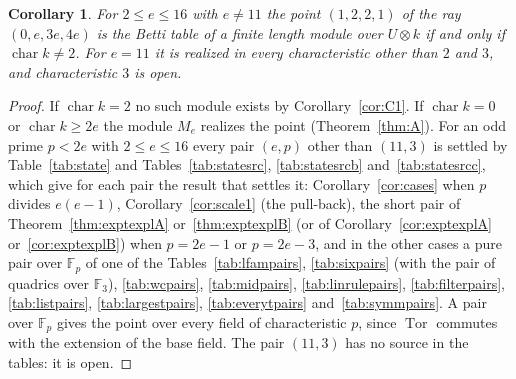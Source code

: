 \documentclass[11pt]{article}
\newtheorem{corollary}{Corollary}
\theoremstyle{definition}
\theoremstyle{remark}
\newcommand{\F}{\mathbb{F}}
\newcommand{\Tor}{\operatorname{Tor}}
\newcommand{\ch}{\operatorname{char}}
\begin{document}
\begin{table}[htbp]
\centering\scriptsize

\caption{Table~\ref{tab:statesrc} continued: the pairs $(e,p)$ with $11\le e\le14$ and $p$ odd below $2e$ and the result that settles each; the pairs marked open are those with no pure pair known. The table continues in Table~\ref{tab:statesrcc}.}
\label{tab:statesrcb}
\end{table}

\begin{table}[htbp]
\centering\scriptsize

\caption{Tables~\ref{tab:statesrc} and~\ref{tab:statesrcb} continued: the pairs $(e,p)$ with $e=15$ and $e=16$ and $p$ odd below $2e$ and the result that settles each.}
\label{tab:statesrcc}
\end{table}

\begin{corollary}\label{cor:eight}
For $2\le e\le16$ with $e\ne11$ the point $(1,2,2,1)$ of the ray $(0,e,3e,4e)$ is the Betti table of a finite length module over $U\otimes k$ if and only if $\ch k\ne2$. For $e=11$ it is realized in every characteristic other than $2$ and $3$, and characteristic $3$ is open.
\end{corollary}
\begin{proof}
If $\ch k=2$ no such module exists by Corollary~\ref{cor:C1}. If $\ch k=0$ or $\ch k\ge2e$ the module $M_e$ realizes the point (Theorem~\ref{thm:A}). For an odd prime $p<2e$ with $2\le e\le16$ every pair $(e,p)$ other than $(11,3)$ is settled by Table~\ref{tab:state} and Tables~\ref{tab:statesrc}, \ref{tab:statesrcb} and~\ref{tab:statesrcc}, which give for each pair the result that settles it: Corollary~\ref{cor:cases} when $p$ divides $e(e-1)$, Corollary~\ref{cor:scale1} (the pull-back), the short pair of Theorem~\ref{thm:exptexplA} or~\ref{thm:exptexplB} (or of Corollary~\ref{cor:exptexplA} or~\ref{cor:exptexplB}) when $p=2e-1$ or $p=2e-3$, and in the other cases a pure pair over $\F_p$ of one of the Tables~\ref{tab:lfampairs}, \ref{tab:sixpairs} (with the pair of quadrics over $\F_3$), \ref{tab:wcpairs}, \ref{tab:midpairs}, \ref{tab:linrulepairs}, \ref{tab:filterpairs}, \ref{tab:listpairs}, \ref{tab:largestpairs}, \ref{tab:everytpairs} and~\ref{tab:symmpairs}. A pair over $\F_p$ gives the point over every field of characteristic $p$, since $\Tor$ commutes with the extension of the base field. The pair $(11,3)$ has no source in the tables: it is open.
\end{proof}
\end{document}
